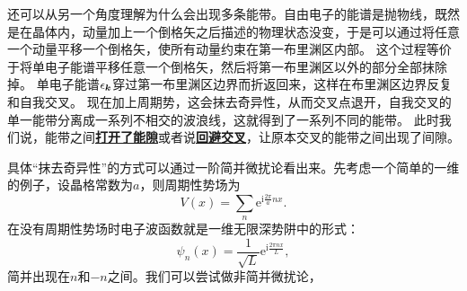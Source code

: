\documentclass[hyperref, UTF8, a4paper]{ctexart}
\newcommand*{\ii}{\mathrm{i}}
\newcommand*{\ee}{\mathrm{e}}
\newcommand*{\concept}[1]{\underline{\textbf{#1}}}
\begin{document}
还可以从另一个角度理解为什么会出现多条能带。自由电子的能谱是抛物线，既然是在晶体内，动量加上一个倒格矢之后描述的物理状态没变，于是可以通过将任意一个动量平移一个倒格矢，使所有动量约束在第一布里渊区内部。
这个过程等价于将单电子能谱平移任意一个倒格矢，然后将第一布里渊区以外的部分全部抹除掉。
单电子能谱$\epsilon_{\vb*{k}}$穿过第一布里渊区边界而折返回来，这样在布里渊区边界反复和自我交叉。
现在加上周期势，这会抹去奇异性，从而交叉点退开，自我交叉的单一能带分离成一系列不相交的波浪线，这就得到了一系列不同的能带。
此时我们说，能带之间\concept{打开了能隙}或者说\concept{回避交叉}，让原本交叉的能带之间出现了间隙。

具体“抹去奇异性”的方式可以通过一阶简并微扰论看出来。先考虑一个简单的一维的例子，设晶格常数为$a$，则周期性势场为
\[
    V(x) = \sum_n \ee^{\ii \frac{2 \pi}{a} n x}.
\]
在没有周期性势场时电子波函数就是一维无限深势阱中的形式：
\[
    \psi_n(x) = \frac{1}{\sqrt{L}} \ee^{\ii \frac{2 \pi n x}{L}},
\]
简并出现在$n$和$-n$之间。我们可以尝试做非简并微扰论，
\end{document}
